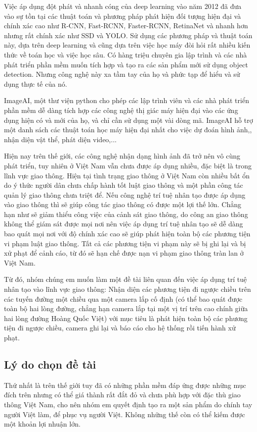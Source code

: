 \documentclass[12pt,twoside,a4paper]{article}
\begin{document}
Việc áp dụng đột phát và nhanh cóng của deep learning vào năm 2012 đã đưa vào sự tồn tại các thuật toán và phương pháp phát hiện đối tượng hiện đại và chính xác cao như R-CNN, Fast-RCNN, Faster-RCNN, RetinaNet và nhanh hơn nhưng rất chính xác như SSD và YOLO. Sử dụng các phương pháp và thuật toán này, dựa trên deep learning và cũng dựa trên việc học máy đòi hỏi rất nhiều kiến thức về toán học và việc học sâu. Có hàng triệu chuyên gia lập trình và các nhà phát triển phần mềm muốn tích hợp và tạo ra các sản phẩm mới sử dụng object detection. Nhưng công nghệ này xa tầm tay của họ và phức tạp để hiểu và sử dụng thực tế của nó.

ImageAI, một thư viện python cho phép các lập trình viên và các nhà phát triển phần mềm dễ dàng tích hợp các công nghệ thị giác máy hiện đại vào các ứng dụng hiện có và mới của họ, và chỉ cần sử dụng một vài dòng mã. ImageAI hỗ trợ một danh sách các thuật toán học máy hiện đại nhất cho việc dự đoán hình ảnh,, nhận diện vật thể, phát diện video,...

Hiện nay trên thế giới, các công nghệ nhận dạng hình ảnh đã trở nên vô cùng phát triển, tuy nhiên ở Việt Nam vẫn chưa được áp dụng nhiều, đặc biệt là trong lĩnh vực giao thông. Hiện tại tình trạng giao thông ở Việt Nam còn nhiều bất ổn do ý thức người dân chưa chấp hành tốt luật giao thông và một phần công tác quản lý giao thông chưa triệt để. Nếu công nghệ trí tuệ nhân tạo được áp dụng vào giao thông thì sẽ giúp công tác giao thông có được một lợi thế lớn. Chẳng hạn như sẽ giảm thiểu công việc của cảnh sát giao thông, do công an giao thông không thể giám sát được mọi nơi nên việc áp dụng trí tuệ nhân tạo sẽ dễ dàng bao quát mọi nơi với độ chính xác cao sẽ giúp phát hiện toàn bộ các phương tiện vi phạm luật giao thông. Tất cả các phương tiện vi phạm này sẽ bị ghi lại và bị xử phạt để cảnh cáo, từ đó sẽ hạn chế được nạn vi phạm giao thông tràn lan ở Việt Nam.

Từ đó, nhóm chúng em muốn làm một đề tài liên quan đến việc áp dụng trí tuệ nhân tạo vào lĩnh vực giao thông: Nhận diện các phương tiện đi ngược chiều trên các tuyến đường một chiều qua một camera lắp cố định (có thể bao quát được toàn bộ hai lòng đường, chẳng hạn camera lắp tại một vị trí trên cao chính giữa hai lòng đường Hoàng Quốc Việt) với mục tiêu là phát hiện toàn bộ các phương tiện đi ngược chiều, camera ghi lại và báo cáo cho hệ thống rồi tiến hành xử phạt.


\subsection{Lý do chọn đề tài}
Thứ nhất là trên thế giới tuy đã có những phần mềm đáp ứng được những mục đích trên nhưng có thể giá thành rất đắt đỏ và chưa phù hợp với đặc thù giao thông Việt Nam, cho nên nhóm em quyết định tạo ra một sản phẩm do chính tay người Việt làm, để phục vụ người Việt. Không những thế còn có thể kiếm được một khoản lợi nhuận lớn.
\end{document}
